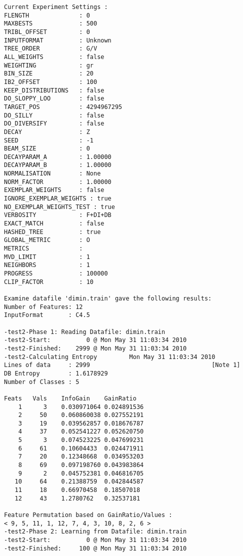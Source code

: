 \documentclass{report}
\begin{document}
\begin{footnotesize}
\begin{verbatim}
Current Experiment Settings :
FLENGTH              : 0
MAXBESTS             : 500
TRIBL_OFFSET         : 0
INPUTFORMAT          : Unknown
TREE_ORDER           : G/V
ALL_WEIGHTS          : false
WEIGHTING            : gr
BIN_SIZE             : 20
IB2_OFFSET           : 100
KEEP_DISTRIBUTIONS   : false
DO_SLOPPY_LOO        : false
TARGET_POS           : 4294967295
DO_SILLY             : false
DO_DIVERSIFY         : false
DECAY                : Z
SEED                 : -1
BEAM_SIZE            : 0
DECAYPARAM_A         : 1.00000
DECAYPARAM_B         : 1.00000
NORMALISATION        : None
NORM_FACTOR          : 1.00000
EXEMPLAR_WEIGHTS     : false
IGNORE_EXEMPLAR_WEIGHTS : true
NO_EXEMPLAR_WEIGHTS_TEST : true
VERBOSITY            : F+DI+DB
EXACT_MATCH          : false
HASHED_TREE          : true
GLOBAL_METRIC        : O
METRICS              :
MVD_LIMIT            : 1
NEIGHBORS            : 1
PROGRESS             : 100000
CLIP_FACTOR          : 10

Examine datafile 'dimin.train' gave the following results:
Number of Features: 12
InputFormat       : C4.5

-test2-Phase 1: Reading Datafile: dimin.train
-test2-Start:          0 @ Mon May 31 11:03:34 2010
-test2-Finished:    2999 @ Mon May 31 11:03:34 2010
-test2-Calculating Entropy         Mon May 31 11:03:34 2010
Lines of data     : 2999                                  [Note 1]
DB Entropy        : 1.6178929
Number of Classes : 5

Feats	Vals	InfoGain	GainRatio
    1      3	0.030971064	0.024891536
    2     50	0.060860038	0.027552191
    3     19	0.039562857	0.018676787
    4     37	0.052541227	0.052620750
    5      3	0.074523225	0.047699231
    6     61	0.10604433	0.024471911
    7     20	0.12348668	0.034953203
    8     69	0.097198760	0.043983864
    9      2	0.045752381	0.046816705
   10     64	0.21388759	0.042844587
   11     18	0.66970458	0.18507018
   12     43	1.2780762	0.32537181

Feature Permutation based on GainRatio/Values :
< 9, 5, 11, 1, 12, 7, 4, 3, 10, 8, 2, 6 >
-test2-Phase 2: Learning from Datafile: dimin.train
-test2-Start:          0 @ Mon May 31 11:03:34 2010
-test2-Finished:     100 @ Mon May 31 11:03:34 2010


\end{verbatim}
\end{footnotesize}
\end{document}
